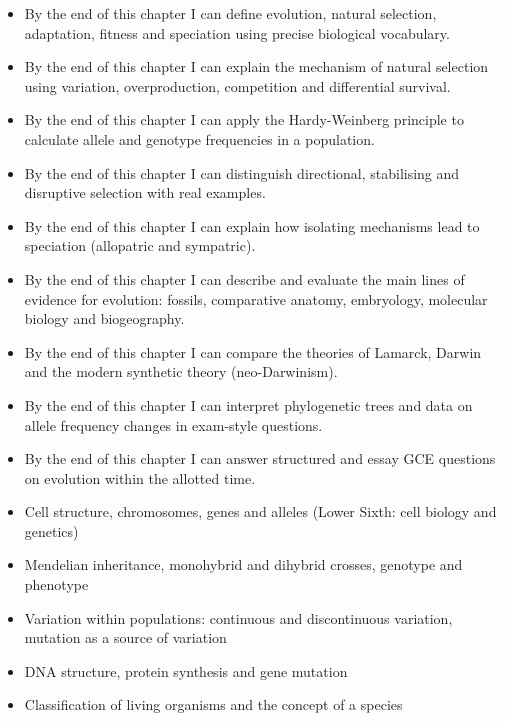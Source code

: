 \documentclass[11pt]{article}
\begin{document}
\begin{objectifs}
\begin{itemize}
\item By the end of this chapter I can define evolution, natural selection, adaptation, fitness and speciation using precise biological vocabulary.
\item By the end of this chapter I can explain the mechanism of natural selection using variation, overproduction, competition and differential survival.
\item By the end of this chapter I can apply the Hardy-Weinberg principle to calculate allele and genotype frequencies in a population.
\item By the end of this chapter I can distinguish directional, stabilising and disruptive selection with real examples.
\item By the end of this chapter I can explain how isolating mechanisms lead to speciation (allopatric and sympatric).
\item By the end of this chapter I can describe and evaluate the main lines of evidence for evolution: fossils, comparative anatomy, embryology, molecular biology and biogeography.
\item By the end of this chapter I can compare the theories of Lamarck, Darwin and the modern synthetic theory (neo-Darwinism).
\item By the end of this chapter I can interpret phylogenetic trees and data on allele frequency changes in exam-style questions.
\item By the end of this chapter I can answer structured and essay GCE questions on evolution within the allotted time.
\end{itemize}
\end{objectifs}

\begin{prerequis}
\begin{itemize}
\item Cell structure, chromosomes, genes and alleles (Lower Sixth: cell biology and genetics)
\item Mendelian inheritance, monohybrid and dihybrid crosses, genotype and phenotype
\item Variation within populations: continuous and discontinuous variation, mutation as a source of variation
\item DNA structure, protein synthesis and gene mutation
\item Classification of living organisms and the concept of a species
\end{itemize}
\end{prerequis}
\end{document}
